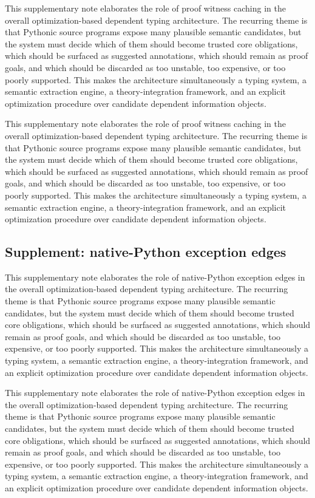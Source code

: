 \documentclass[11pt]{article}
\theoremstyle{definition}
\theoremstyle{plain}
\begin{document}
This supplementary note elaborates the role of proof witness caching in the overall
optimization-based dependent typing architecture. The recurring theme is that
Pythonic source programs expose many plausible semantic candidates, but the
system must decide which of them should become trusted core obligations, which
should be surfaced as suggested annotations, which should remain as proof
goals, and which should be discarded as too unstable, too expensive, or too
poorly supported. This makes the architecture simultaneously a typing system,
a semantic extraction engine, a theory-integration framework, and an explicit
optimization procedure over candidate dependent information objects.

This supplementary note elaborates the role of proof witness caching in the overall
optimization-based dependent typing architecture. The recurring theme is that
Pythonic source programs expose many plausible semantic candidates, but the
system must decide which of them should become trusted core obligations, which
should be surfaced as suggested annotations, which should remain as proof
goals, and which should be discarded as too unstable, too expensive, or too
poorly supported. This makes the architecture simultaneously a typing system,
a semantic extraction engine, a theory-integration framework, and an explicit
optimization procedure over candidate dependent information objects.

\subsection{Supplement: native-Python exception edges}
This supplementary note elaborates the role of native-Python exception edges in the overall
optimization-based dependent typing architecture. The recurring theme is that
Pythonic source programs expose many plausible semantic candidates, but the
system must decide which of them should become trusted core obligations, which
should be surfaced as suggested annotations, which should remain as proof
goals, and which should be discarded as too unstable, too expensive, or too
poorly supported. This makes the architecture simultaneously a typing system,
a semantic extraction engine, a theory-integration framework, and an explicit
optimization procedure over candidate dependent information objects.

This supplementary note elaborates the role of native-Python exception edges in the overall
optimization-based dependent typing architecture. The recurring theme is that
Pythonic source programs expose many plausible semantic candidates, but the
system must decide which of them should become trusted core obligations, which
should be surfaced as suggested annotations, which should remain as proof
goals, and which should be discarded as too unstable, too expensive, or too
poorly supported. This makes the architecture simultaneously a typing system,
a semantic extraction engine, a theory-integration framework, and an explicit
optimization procedure over candidate dependent information objects.
\end{document}
